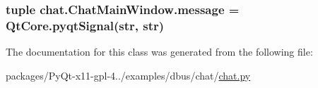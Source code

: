 \subsubsection[{message}]{\setlength{\rightskip}{0pt plus 5cm}tuple chat.\+Chat\+Main\+Window.\+message = Qt\+Core.\+pyqt\+Signal(str, str)\hspace{0.3cm}{\ttfamily [static]}}\label{classchat_1_1ChatMainWindow_a8793534d6a7c1a8465a9569f6fa1bc89}


The documentation for this class was generated from the following file\+:\begin{DoxyCompactItemize}
\item 
packages/\+Py\+Qt-\/x11-\/gpl-\/4../examples/dbus/chat/\hyperlink{chat_8py}{chat.\+py}\end{DoxyCompactItemize}
